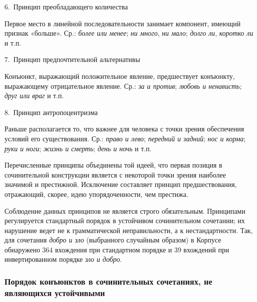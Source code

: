 6.~Принцип преобладающего количества

Первое место в линейной последовательности занимает компонент, имеющий
признак «больше». Ср.: \emph{более или менее}; \emph{ни много}, \emph{ни
мало}; \emph{долго ли}, \emph{коротко ли} и т.п.

7.~Принцип предпочтительной альтернативы

Конъюнкт, выражающий положительное явление, предшествует конъюнкту,
выражающему отрицательное явление. Ср.: \emph{за и против}; \emph{любовь
и ненависть}; \emph{друг или враг} и т.п.

8.~Принцип антропоцентризма

Раньше располагается то, что важнее для человека с точки зрения
обеспечения условий его существования. Ср.: \emph{право и лево};
\emph{передний и задний}; \emph{нос и корма}; \emph{руки и ноги};
\emph{жизнь и смерть}; \emph{день и ночь} и т.п.

Перечисленные принципы объединены той идеей, что первая позиция в
сочинительной конструкции является с некоторой точки зрения наиболее
значимой и престижной. Исключение составляет принцип предшествования,
отражающий, скорее, идею упорядоченности, чем престижа.

Соблюдение данных принципов не является строго обязательным. Принципами
регулируется стандартный порядок в устойчивом сочинительном сочетании;
их нарушение ведет не к грамматической неправильности, а к
нестандартности. Так, для сочетания \emph{добро и зло} (выбранного
случайным образом) в Корпусе обнаружено 364 вхождения при стандартном
порядке и 39 вхождений при инвертированном порядке \emph{зло и добро}.

\hypertarget{ux43fux43eux440ux44fux434ux43eux43a-ux43aux43eux43dux44aux44eux43dux43aux442ux43eux432-ux432-ux441ux43eux447ux438ux43dux438ux442ux435ux43bux44cux43dux44bux445-ux441ux43eux447ux435ux442ux430ux43dux438ux44fux445-ux43dux435-ux44fux432ux43bux44fux44eux449ux438ux445ux441ux44f-ux443ux441ux442ux43eux439ux447ux438ux432ux44bux43cux438}{%
\subsubsection{Порядок конъюнктов в сочинительных сочетаниях, не
являющихся
устойчивыми}\label{ux43fux43eux440ux44fux434ux43eux43a-ux43aux43eux43dux44aux44eux43dux43aux442ux43eux432-ux432-ux441ux43eux447ux438ux43dux438ux442ux435ux43bux44cux43dux44bux445-ux441ux43eux447ux435ux442ux430ux43dux438ux44fux445-ux43dux435-ux44fux432ux43bux44fux44eux449ux438ux445ux441ux44f-ux443ux441ux442ux43eux439ux447ux438ux432ux44bux43cux438}}

